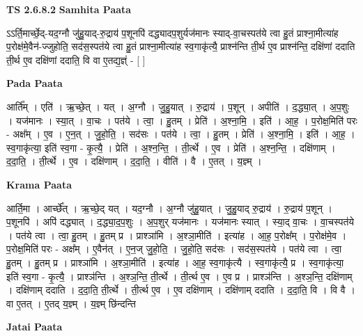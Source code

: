 \documentclass[17pt]{extarticle}
\begin{document}
\textbf{TS 2.6.8.2 } \newline
\textbf{Samhita Paata} \newline

ऽऽर्ति॒मार्च्छे॒द्-यद॒ग्नौ जु॑हु॒याद्-रु॒द्राय॑ प॒शूनपि॑ दद्ध्यादप॒शुर्यज॑मानः स्याद्-वा॒चस्पत॑ये त्वा हु॒तं प्राश्ना॒मीत्या॑ह प॒रोक्ष॑मे॒वैन॑-ज्जुहोति॒ सद॑स॒स्पत॑ये त्वा हु॒तं प्राश्ना॒मीत्या॑ह स्व॒गाकृ॑त्यै॒ प्राश्न॑न्ति ती॒र्थ ए॒व प्राश्न॑न्ति॒ दक्षि॑णां ददाति ती॒र्थ ए॒व दक्षि॑णां ददाति॒ वि वा ए॒तद्य॒ज्ञ्ं - [  ] \newline

\textbf{Pada Paata} \newline

आर्ति᳚म् । एति॑ । ऋ॒च्छे॒त् । यत् । अ॒ग्नौ । जु॒हु॒यात् । रु॒द्राय॑ । प॒शून् । अपीति॑ । द॒द्ध्या॒त् । अ॒प॒शुः । यज॑मानः । स्या॒त् । वा॒चः । पत॑ये । त्वा॒ । हु॒तम् । प्रेति॑ । अ॒श्ना॒मि॒ । इति॑ । आ॒ह॒ । प॒रोक्ष॒मिति॑ परः - अक्ष᳚म् । ए॒व । ए॒न॒त् । जु॒हो॒ति॒ । सद॑सः । पत॑ये । त्वा॒ । हु॒तम् । प्रेति॑ । अ॒श्ना॒मि॒ । इति॑ । आ॒ह॒ । स्व॒गाकृ॑त्या॒ इति॑ स्व॒गा - कृ॒त्यै॒ । प्रेति॑ । अ॒श्न॒न्ति॒ । ती॒र्त्थे । ए॒व । प्रेति॑ । अ॒श्न॒न्ति॒ । दक्षि॑णाम् । द॒दा॒ति॒ । ती॒र्त्थे । ए॒व । दक्षि॑णाम् । द॒दा॒ति॒ । वीति॑ । वै । ए॒तत् । य॒ज्ञ्म् ।  \newline


\textbf{Krama Paata} \newline

आर्ति॒मा । आर्च्छे᳚त् । ऋ॒च्छे॒द् यत् । यद॒ग्नौ । अ॒ग्नौ जु॑हु॒यात् । जु॒हु॒याद् रु॒द्राय॑ । रु॒द्राय॑ प॒शून् । प॒शूनपि॑ । अपि॑ दद्ध्यात् । द॒द्ध्या॒द॒प॒शुः । अ॒प॒शुर् यज॑मानः । यज॑मानः स्यात् । स्या॒द् वा॒चः । वा॒चस्पत॑ये । पत॑ये त्वा । त्वा॒ हु॒तम् । हु॒तम् प्र । प्राश्ञा॑मि । अ॒श्ञा॒मीति॑ । इत्या॑ह । आ॒ह॒ प॒रोक्ष᳚म् । प॒रोक्ष॑मे॒व । प॒रोक्ष॒मिति॑ परः - अक्ष᳚म् । ए॒वैन॑त् । ए॒न॒ज् जु॒हो॒ति॒ । जु॒हो॒ति॒ सद॑सः । सद॑स॒स्पत॑ये । पत॑ये त्वा । त्वा॒ हु॒तम् । हु॒तम् प्र । प्राश्ञा॑मि । अ॒श्ञा॒मीति॑ । इत्या॑ह । आ॒ह॒ स्व॒गाकृ॑त्यै । स्व॒गाकृ॑त्यै॒ प्र । स्व॒गाकृ॑त्या॒ इति॑ स्व॒गा - कृ॒त्यै॒ । प्राश्ञ॑न्ति । अ॒श्ञ॒न्ति॒ ती॒र्त्थे । ती॒र्त्थ ए॒व । ए॒व प्र । प्राश्ञ॑न्ति । अ॒श्ञ॒न्ति॒ दक्षि॑णाम् । दक्षि॑णाम् ददाति । द॒दा॒ति॒ ती॒र्त्थे । ती॒र्त्थ ए॒व । ए॒व दक्षि॑णाम् । दक्षि॑णाम् ददाति । द॒दा॒ति॒ वि । वि वै । वा ए॒तत् । ए॒तद् य॒ज्ञ्म् । य॒ज्ञ्म् छि॑न्दन्ति \newline

\textbf{Jatai Paata} \newline
\end{document}

